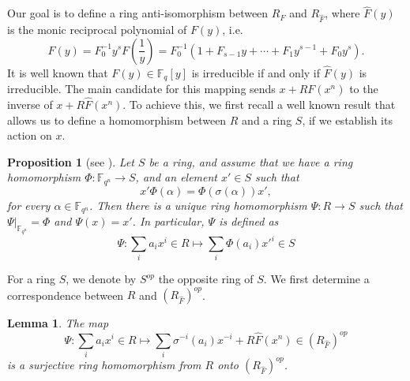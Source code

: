 \documentclass[a4paper, 11pt]{article}
\newtheorem{lemma}[theorem]{Lemma}
\newtheorem{proposition}[theorem]{Proposition}
\newcommand{\fqn}{\mathbb{F}_{q^n}}
\newcommand{\F}{{\mathbb F}}
\begin{document}
Our goal is to define a ring anti-isomorphism between $R_F$ and $R_{\hat{F}}$, where \(\hat{F}(y)\) is the {monic reciprocal polynomial} of $F(y)$, i.e.
\[
\hat{F}(y)=F_0^{-1}y^s F\left(\frac{1}{y}\right)=F_{0}^{-1}(1 + F_{s-1} y + \cdots + F_1 y^{s-1} + F_0 y^{s}).
\]
It is well known that $F(y) \in \F_q[y]$ is irreducible if and only if $\hat{F}(y)$ is irreducible. The main candidate for this mapping sends $x + R F(x^n)$ to the inverse of $x + R \hat{F}(x^n)$. To achieve this, we first recall a well known result that allows us to define a homomorphism between $R$ and a ring $S$, if we establish its action on $x$.

\begin{proposition} [see \textnormal{\cite[Proposition 2.4]{goodearl2004introduction}}] \label{prop:howtoextend}
Let $S$ be a ring, and assume that we have a ring homomorphism $\Phi:\F_{q^n} \rightarrow S$, and an element $x' \in S$ such that 
\begin{equation} \label{eq:relationtoextend}
    x'\Phi(\alpha)=\Phi(\sigma(\alpha))x',
\end{equation}
for every $\alpha \in \F_{q^n}$.
Then there is a unique ring homomorphism $\Psi: R \rightarrow S$ such that $\Psi |_{\fqn}=\Phi$ and $\Psi(x)=x'$. In particular, $\Psi$ is defined as
\begin{equation} \label{eq:extendedring}
\Psi: \sum_{i}a_ix^i \in R \longmapsto \sum_{i}\Phi(a_i)x'^i \in S
\end{equation}
\end{proposition}




For a ring $S$, we denote by $S^{op}$ the opposite ring of $S$. We first determine a correspondence between $R$ and $\left(R_{\hat{F}}\right)^{op}$.

\begin{lemma} \label{lm:RinRFopp}
The map 
    \[
    \Psi: \sum_ia_ix^i \in R \longmapsto \sum_i \sigma^{-i}(a_i)x^{-i} + R\hat{F}(x^n) \in \left(R_{\hat{F}}\right)^{op}
    \]
    is a surjective ring homomorphism from $R$ onto $\left(R_{\hat{F}}\right)^{op}$.
\end{lemma}
\end{document}
